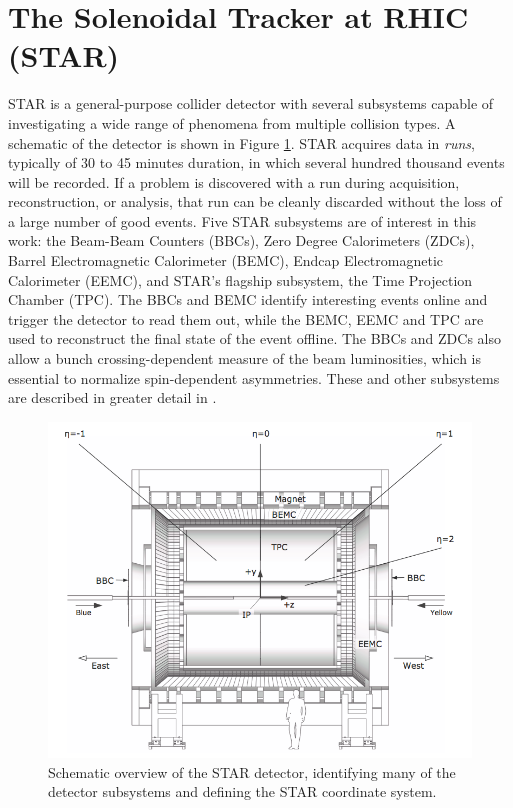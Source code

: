 \section{The Solenoidal Tracker at RHIC (STAR)}

STAR \cite{Ackermann:2002ad} is a general-purpose collider detector with
several subsystems capable of investigating a wide range of phenomena from
multiple collision types. A schematic of the detector is shown in Figure
\ref{fig:star-schematic}. STAR acquires data in \textit{runs}, typically of 30
to 45 minutes duration, in which several hundred thousand events will be
recorded. If a problem is discovered with a run during acquisition,
reconstruction, or analysis, that run can be cleanly discarded without the
loss of a large number of good events. Five STAR subsystems are of interest in
this work: the Beam-Beam Counters (BBCs), Zero Degree Calorimeters (ZDCs),
Barrel Electromagnetic Calorimeter (BEMC), Endcap Electromagnetic Calorimeter
(EEMC), and STAR's flagship subsystem, the Time Projection Chamber (TPC). The
BBCs and BEMC identify interesting events online and trigger the detector to
read them out, while the BEMC, EEMC and TPC are used to reconstruct the final
state of the event offline. The BBCs and ZDCs also allow a bunch
crossing-dependent measure of the beam luminosities, which is essential to
normalize spin-dependent asymmetries. These and other subsystems are described
in greater detail in \cite{Harrison:2003sb}.

\begin{figure}
  \includegraphics[width=1.0\textwidth]{figures/star-schematic-new}
  \caption{Schematic overview of the STAR detector, identifying many of the
  detector subsystems and defining the STAR coordinate system.}
  \label{fig:star-schematic}
\end{figure}

